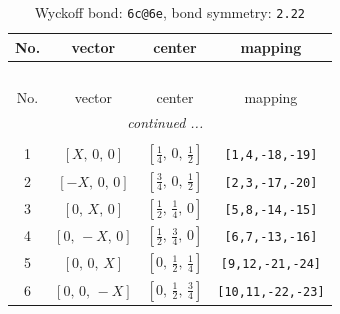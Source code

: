 \documentclass[fleqn,8pt]{jsarticle}
\begin{document}
\begin{longtable}{cccc}
\caption{Wyckoff bond: {\tt 6c@6e}, bond symmetry: {\tt 2.22}}
 \\
 \hline \hline
No. & vector & center & mapping \\ \hline \endfirsthead

\multicolumn{3}{l}{\tablename\ \thetable{}} \\
 \hline \hline
No. & vector & center & mapping \\ \hline \endhead

 \hline \hline
\multicolumn{3}{r}{\footnotesize\it continued ...} \\ \endfoot

 \hline \hline
\multicolumn{3}{r}{} \\ \endlastfoot

1 & $\left[ X,\, 0,\, 0 \right]$ & $\left[ \frac{1}{4},\, 0,\, \frac{1}{2} \right]$ & {\tt [1,4,-18,-19]} \\ \hline
2 & $\left[ - X,\, 0,\, 0 \right]$ & $\left[ \frac{3}{4},\, 0,\, \frac{1}{2} \right]$ & {\tt [2,3,-17,-20]} \\ \hline
3 & $\left[ 0,\, X,\, 0 \right]$ & $\left[ \frac{1}{2},\, \frac{1}{4},\, 0 \right]$ & {\tt [5,8,-14,-15]} \\ \hline
4 & $\left[ 0,\, - X,\, 0 \right]$ & $\left[ \frac{1}{2},\, \frac{3}{4},\, 0 \right]$ & {\tt [6,7,-13,-16]} \\ \hline
5 & $\left[ 0,\, 0,\, X \right]$ & $\left[ 0,\, \frac{1}{2},\, \frac{1}{4} \right]$ & {\tt [9,12,-21,-24]} \\ \hline
6 & $\left[ 0,\, 0,\, - X \right]$ & $\left[ 0,\, \frac{1}{2},\, \frac{3}{4} \right]$ & {\tt [10,11,-22,-23]} \\
\end{longtable}
\renewcommand{\arraystretch}{1.2}
\end{document}

